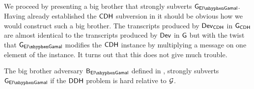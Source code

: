 We proceed by presenting a big brother that strongly subverts $\cgame_{\elGamal}$. Having already established the $\mathsf{CDH}$ subversion in  it should be obvious how we would construct such a big brother. The transcripts produced by $\operatorname{\mathsf{Dev}}_{\mathsf{CDH}}$ in $\operatorname{\mathsf{G}}_{\mathsf{CDH}}$ are almost identical to the transcripts produced by $\operatorname{\mathsf{Dev}}$ in $\operatorname{\mathsf{G}}$ but with the twist that $\cgame_{\elGamal}$ modifies the $\mathsf{CDH}$ instance by multiplying a message on one element of the instance. It turns out that this does not give much trouble. 

\begin{thm}
The big brother adversary $\bb_{\elGamal}$ defined in , strongly subverts $\cgame_{\elGamal}$ if the $\mathsf{DDH}$ problem is hard relative to $\operatorname{\mathcal{G}}$.
\end{thm}

